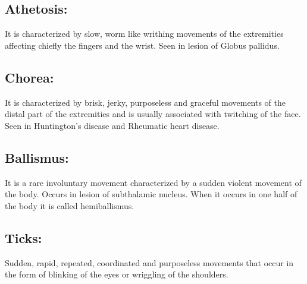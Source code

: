 \documentclass[a4paper,12pt,openany,twoside]{book}
\begin{document}
	\subsection*{Athetosis:}
		It is characterized by slow, worm like writhing movements of the extremities affecting chiefly the fingers and the wrist. Seen in lesion of Globus pallidus.
		\subsection*{Chorea:}
			It is characterized by brisk, jerky, purposeless and graceful movements of the distal part of the extremities and is usually associated with twitching of the face. Seen in Huntington's disease and Rheumatic heart disease.
			\subsection*{Ballismus:}
				It is a rare involuntary movement characterized by a sudden violent movement of the body. Occurs in lesion of subthalamic nucleus. When it occurs in one half of the body it is called hemiballismus.
				\subsection*{Ticks:}
				Sudden, rapid, repeated, coordinated and purposeless movements that occur in the form of blinking of the eyes or wriggling of the shoulders.
\end{document}

